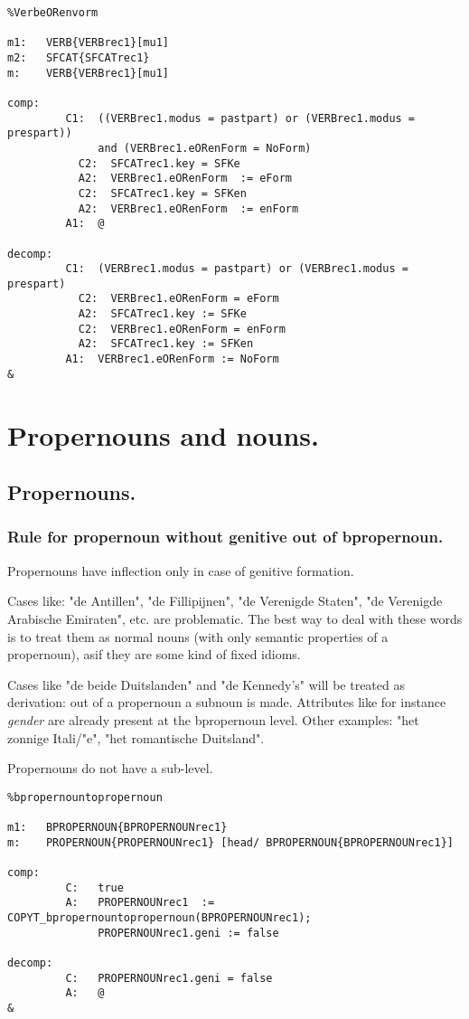 \begin{verbatim}
%VerbeORenvorm

m1:   VERB{VERBrec1}[mu1]
m2:   SFCAT{SFCATrec1}
m:    VERB{VERBrec1}[mu1]

comp:
         C1:  ((VERBrec1.modus = pastpart) or (VERBrec1.modus = prespart)) 
              and (VERBrec1.eORenForm = NoForm)
           C2:  SFCATrec1.key = SFKe
           A2:  VERBrec1.eORenForm  := eForm
           C2:  SFCATrec1.key = SFKen
           A2:  VERBrec1.eORenForm  := enForm
         A1:  @

decomp:
         C1:  (VERBrec1.modus = pastpart) or (VERBrec1.modus = prespart)
           C2:  VERBrec1.eORenForm = eForm
           A2:  SFCATrec1.key := SFKe
           C2:  VERBrec1.eORenForm = enForm
           A2:  SFCATrec1.key := SFKen
         A1:  VERBrec1.eORenForm := NoForm
&
\end{verbatim}



\newpage
\section{Propernouns and nouns.}
\subsection{Propernouns.}
\subsubsection{Rule for propernoun without genitive out of bpropernoun.}

Propernouns have inflection only in case of genitive formation.

Cases like: "de Antillen", "de Fillipijnen", "de Verenigde Staten", 
            "de Verenigde Arabische Emiraten", etc. are problematic.
The best way to deal with these words is to treat them as normal nouns (with 
only semantic properties of a propernoun), asif they are some kind of fixed
idioms.

Cases like "de beide Duitslanden" and "de Kennedy's" will be treated as 
derivation: out of a propernoun a subnoun is made.
Attributes like for instance {\em gender} are already present 
at the bpropernoun level. Other examples: "het zonnige Itali/"{e}", 
"het romantische Duitsland".  

Propernouns do not have a sub-level.

\begin{verbatim}
%bpropernountopropernoun

m1:   BPROPERNOUN{BPROPERNOUNrec1}
m:    PROPERNOUN{PROPERNOUNrec1} [head/ BPROPERNOUN{BPROPERNOUNrec1}]

comp:    
         C:   true
         A:   PROPERNOUNrec1  := COPYT_bpropernountopropernoun(BPROPERNOUNrec1);
              PROPERNOUNrec1.geni := false  

decomp:  
         C:   PROPERNOUNrec1.geni = false  
         A:   @
&
\end{verbatim}
\newpage
